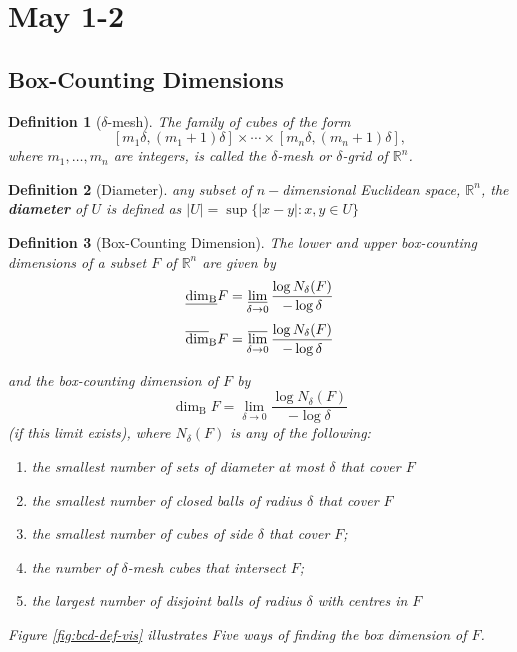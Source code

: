 \documentclass[12pt, a4paper]{article}
\newtheorem{definition}{Definition}[subsection]
\begin{document}
\begin{customsol}{2.5}

\end{customsol}




\newpage
\section{May 1-2}
\subsection{Box-Counting Dimensions}

\begin{definition}[$\delta$-mesh]
    The family of cubes of the form
$$
\left[m_{1} \delta,\left(m_{1}+1\right) \delta\right] \times \cdots \times\left[m_{n} \delta,\left(m_{n}+1\right) \delta\right],
$$
where $m_{1}, \ldots, m_{n}$ are integers, is called the $\delta$-mesh or $\delta$-grid of $\mathbb{R}^n$.
\end{definition}

\begin{definition}[Diameter]
    any subset of $n-$dimensional Euclidean space, $\mathbb{R}^n$, the \textbf{diameter} of $U$ is defined as $|U|=\sup \{|x-y|:x, y\in U\}$
\end{definition}

\begin{definition}[Box-Counting Dimension]\label{bcd-def}
    The lower and upper box-counting dimensions of a subset $F$ of $\mathbb{R}^{n}$ are given by
    $$\underline{\operatorname{dim}_{\mathrm{B}}} F=\varliminf_{\delta \rightarrow 0} \frac{\log N_{\delta}(F)}{-\log \delta}$$
    $$\overline{\operatorname{dim}}_{\mathrm{B}} F=\varlimsup_{\delta \rightarrow 0} \frac{\log N_{\delta}(F)}{-\log \delta}$$
    
and the box-counting dimension of $F$ by
$$
\operatorname{dim}_{\mathrm{B}} F=\lim _{\delta \rightarrow 0} \frac{\log N_{\delta}(F)}{-\log \delta}
$$
(if this limit exists), where $N_{\delta}(F)$ is any of the following:
\begin{enumerate}[i]
    \item the smallest number of sets of diameter at most $\delta$ that cover $F$
    \item  the smallest number of closed balls of radius $\delta$ that cover $F$
    \item  the smallest number of cubes of side $\delta$ that cover $F$;
    \item  the number of $\delta$-mesh cubes that intersect $F$;
    \item  the largest number of disjoint balls of radius $\delta$ with centres in $F$  
\end{enumerate}  
Figure \ref{fig:bcd-def-vis} illustrates Five ways of finding the box dimension of $F$.

\end{definition}
\end{document}
